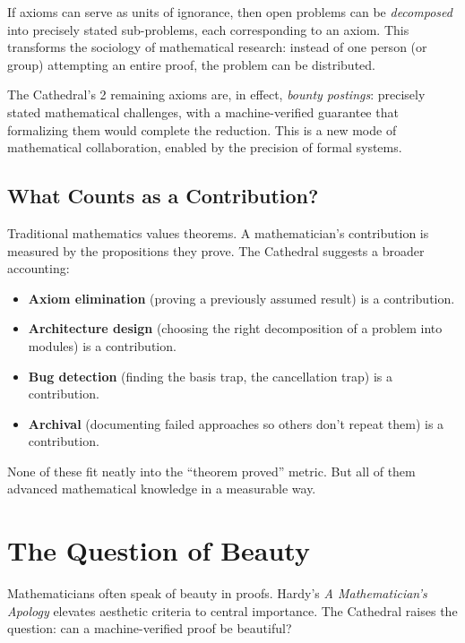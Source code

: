 \documentclass[11pt,a4paper]{article}
\begin{document}
If axioms can serve as units of ignorance, then open problems can
be \emph{decomposed} into precisely stated sub-problems, each
corresponding to an axiom. This transforms the sociology of
mathematical research: instead of one person (or group) attempting
an entire proof, the problem can be distributed.

The Cathedral's 2 remaining axioms are, in effect, \emph{bounty
postings}: precisely stated mathematical challenges, with a
machine-verified guarantee that formalizing them would complete the
reduction. This is a new mode of mathematical collaboration, enabled
by the precision of formal systems.

\subsection{What Counts as a Contribution?}

Traditional mathematics values theorems. A mathematician's
contribution is measured by the propositions they prove. The
Cathedral suggests a broader accounting:

\begin{itemize}
  \item \textbf{Axiom elimination} (proving a previously assumed result)
    is a contribution.
  \item \textbf{Architecture design} (choosing the right decomposition
    of a problem into modules) is a contribution.
  \item \textbf{Bug detection} (finding the basis trap, the cancellation
    trap) is a contribution.
  \item \textbf{Archival} (documenting failed approaches so others
    don't repeat them) is a contribution.
\end{itemize}

None of these fit neatly into the ``theorem proved'' metric. But all
of them advanced mathematical knowledge in a measurable way.

\section{The Question of Beauty}
\label{sec:beauty}

Mathematicians often speak of beauty in proofs. Hardy's \emph{A
Mathematician's Apology} elevates aesthetic criteria to central
importance. The Cathedral raises the question: can a machine-verified
proof be beautiful?
\end{document}
